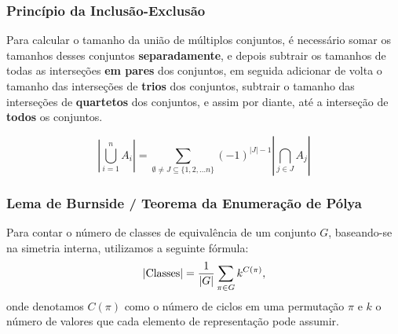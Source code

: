\subsubsection{Princípio da Inclusão-Exclusão}
Para calcular o tamanho da união de múltiplos conjuntos, é necessário somar os tamanhos desses conjuntos \textbf{separadamente}, e depois subtrair os tamanhos de todas as interseções \textbf{em pares} dos conjuntos, em seguida adicionar de volta o tamanho das interseções de \textbf{trios} dos conjuntos, subtrair o tamanho das interseções de \textbf{quartetos} dos conjuntos, e assim por diante, até a interseção de \textbf{todos} os conjuntos.

$$|\bigcup_{i=1}^{n} A_i| = \sum_{\emptyset \neq J \subseteq \{1,2,...n\}}^{} (-1)^{|J|-1}|\bigcap_{j \in J}^{} A_j|$$

\subsubsection{Lema de Burnside / Teorema da Enumeração de Pólya}
Para contar o número de classes de equivalência de um conjunto $G$, baseando-se na simetria interna, utilizamos a seguinte fórmula:
$$|\textnormal{Classes}| = \frac{1}{|G|}\sum_{\pi \in G} k^{C(\pi)},$$
onde denotamos $C(\pi)$ como o número de ciclos em uma permutação $\pi$ e $k$ o número de valores que cada elemento de representação pode assumir.

